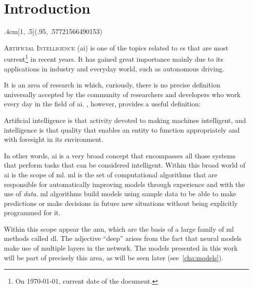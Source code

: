 

\chapter{Introduction}\label{cha:intro}

\begin{textblock*}{.4cm}[1, .5](.95\layoutwidth, .57721566490153\layoutheight)
  \noindent\resizebox{.4cm}{!}{\(\gamma\)}
\end{textblock*}



\lettrine{A}{rtificial Intelligence} (\acs{ai})
is one of the topics related to \gls{cs} that are most current\footnote{On
  \today, current date of the document.} in recent years. It has gained great
importance mainly due to its applications in industry and everyday world, such
as autonomous driving.

It is an area of research in which, curiously, there is no precise definition
universally accepted by the community of researchers and developers who work
every day in the field of \gls{ai}. ,
however, provides a useful definition:
\begin{quoteBox}
  Artificial intelligence is that activity devoted to making machines
  intelligent, and intelligence is that quality that enables an entity to
  function appropriately and with foresight in its environment.
  \tcblower{}
\end{quoteBox}

In other words, \gls{ai} is a very broad concept that encompasses all those
systems that perform tasks that can be considered intelligent. Within this
broad world of \gls{ai} is the scope of \gls{ml}. \Gls{ml} is the set of computational algorithms that are
responsible for automatically improving models through experience and with the
use of \emph{data}. \Gls{ml} algorithms build models using sample data to be
able to make predictions or make decisions in future new situations without
being explicitly programmed for it.

Within this scope appear the \gls{ann}, which are the basis of a large family
of \gls{ml} methods called \gls{dl}. The adjective
``deep'' arises from the fact that neural models make use of multiple layers in
the network. The models presented in this work will be part of precisely this
area, as will be seen later (see\ \vref{cha:models}).

